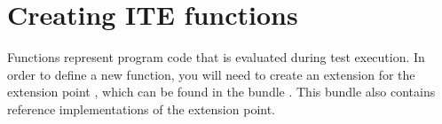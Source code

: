 \chapter{Creating ITE functions}
\label{functions}

Functions represent program code that is evaluated during test execution.
In order to define a new \app{} function, you will need to create an extension
for the extension point , which
can be found in the bundle . This
bundle also contains reference implementations of the extension point.
